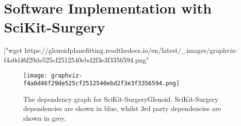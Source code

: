 \section{Software Implementation with SciKit-Surgery}

|"wget https://glenoidplanefitting.readthedocs.io/en/latest/_images/graphviz-f4a0d46f29de525cf2512540ebd2f3e3f3356594.png"

\begin{figure}
	\begin{center}
		\texttt{[image: graphviz-f4a0d46f29de525cf2512540ebd2f3e3f3356594.png]}
                        \caption{The dependency graph for SciKit-SurgeryGlenoid. SciKit-Surgery dependencies are shown in blue, whilst 3rd party dependencies are shown in grey.}
	\end{center}
\end{figure}
